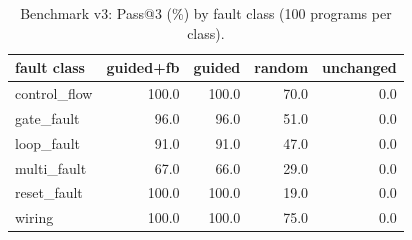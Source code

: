 \begin{table}[t]
\centering
\caption{Benchmark v3: Pass@3 (\%) by fault class (100 programs per class).}
\label{tab:v3class}
\footnotesize
\setlength{\tabcolsep}{3pt}
\begin{tabular}{lrrrr}
\toprule
fault class & guided+fb & guided & random & unchanged \\
\midrule
control\_flow & 100.0 & 100.0 & 70.0 & 0.0 \\
gate\_fault & 96.0 & 96.0 & 51.0 & 0.0 \\
loop\_fault & 91.0 & 91.0 & 47.0 & 0.0 \\
multi\_fault & 67.0 & 66.0 & 29.0 & 0.0 \\
reset\_fault & 100.0 & 100.0 & 19.0 & 0.0 \\
wiring & 100.0 & 100.0 & 75.0 & 0.0 \\
\bottomrule
\end{tabular}
\end{table}
